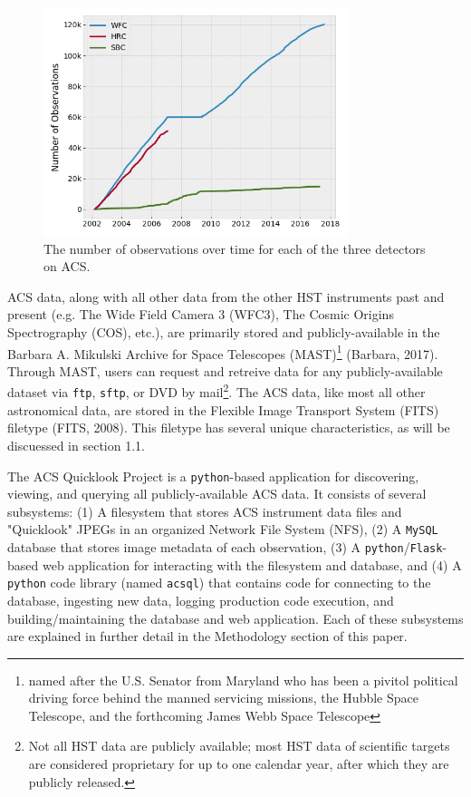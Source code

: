\documentclass[10pt,journal,compsoc]{IEEEtran}
\begin{document}
\begin{figure}[!t]
\centering
\includegraphics[width=3.5in]{./figures/num_obs.png}
\caption{The number of observations over time for each of the three detectors on ACS.}
\label{fig1}
\end{figure}

ACS data, along with all other data from the other HST instruments past and present
(e.g. The Wide Field Camera 3 (WFC3), The Cosmic Origins Spectrography (COS), etc.),
are primarily stored and publicly-available in the Barbara A. Mikulski Archive for
Space Telescopes (MAST)\footnote{named after the U.S. Senator from Maryland who has
been a pivitol political driving force behind the manned servicing missions, the
Hubble Space Telescope, and the forthcoming James Webb Space Telescope} (Barbara, 2017).
Through MAST, users can request and retreive data for any publicly-available dataset
via \texttt{ftp}, \texttt{sftp}, or DVD by mail\footnote{Not all HST data are publicly
available; most HST data of scientific targets are considered proprietary for up to
one calendar year, after which they are publicly released.}.  The ACS data, like most all other
astronomical data, are stored in the Flexible Image Transport System (FITS) filetype
(FITS, 2008).  This filetype has several unique characteristics, as will be
discuessed in section 1.1.

The ACS Quicklook Project is a \texttt{python}-based application for discovering,
viewing, and querying all publicly-available ACS data.  It consists of several subsystems:
(1) A filesystem that stores ACS instrument data files and "Quicklook" JPEGs in an
organized Network File System (NFS), (2) A \texttt{MySQL} database that stores image
metadata of each observation, (3) A \texttt{python}/\texttt{Flask}-based web application
for interacting with the filesystem and database, and (4) A \texttt{python} code library
(named \texttt{acsql}) that contains code for connecting to the database, ingesting new
data, logging production code execution, and building/maintaining the database and web
application.  Each of these subsystems are explained in further detail in the Methodology
section of this paper.
\end{document}
